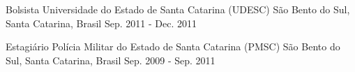 \begin{cventries}
  \cventry
    {Bolsista} %
    {Universidade do Estado de Santa Catarina (UDESC)} %
    {São Bento do Sul, Santa Catarina, Brasil} %
    {Sep. 2011 - Dec. 2011} %
    {
    }

  \cventry
    {Estagiário} %
    {Polícia Militar do Estado de Santa Catarina (PMSC)} %
    {São Bento do Sul, Santa Catarina, Brasil} %
    {Sep. 2009 - Sep. 2011} %
    {
    }

\end{cventries}
